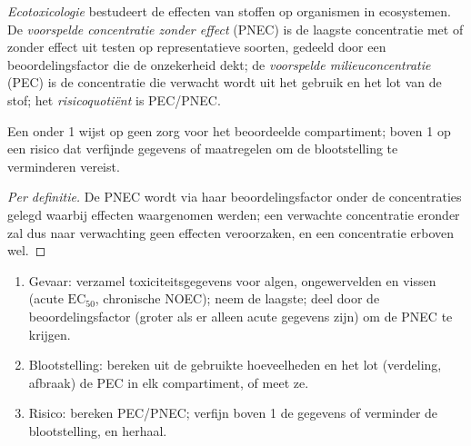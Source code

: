\begin{definition}[Ecotoxicologie]\label{def:b3:environmental-toxicology:ecotoxicology}
\emph{Ecotoxicologie} bestudeert de effecten van
stoffen op organismen in ecosystemen. De
\emph{voorspelde concentratie zonder effect}
(PNEC) is de laagste concentratie met of zonder effect uit testen op
representatieve soorten, gedeeld door een beoordelingsfactor die de
onzekerheid dekt; de
\emph{voorspelde milieuconcentratie}
(PEC) is de concentratie die verwacht wordt uit het gebruik en het lot
van de stof; het \emph{risicoquotiënt}
is PEC/PNEC.
\end{definition}

\begin{proposition}[Risicoquotiënt]\label{prop:b3:environmental-toxicology:risk-quotient}
Een  onder 1 wijst op geen zorg voor het beoordeelde
compartiment; boven 1 op een risico dat verfijnde gegevens of maatregelen
om de blootstelling te verminderen vereist.
\end{proposition}

\begin{proof}[Per definitie]
De PNEC wordt via haar beoordelingsfactor onder de concentraties gelegd
waarbij effecten waargenomen werden; een verwachte concentratie eronder
zal dus naar verwachting geen effecten veroorzaken, en een concentratie
erboven wel.
\end{proof}

\begin{method}\label{met:b3:environmental-toxicology:risk}
\begin{enumerate}
  \item Gevaar: verzamel toxiciteitsgegevens voor algen, ongewervelden en
        vissen (acute
        $\mathrm{EC_{50}}$, chronische NOEC); neem de laagste; deel door de beoordelingsfactor (groter als
        er alleen acute gegevens zijn) om de PNEC te krijgen.
  \item Blootstelling: bereken uit de gebruikte hoeveelheden en het lot
        (verdeling, afbraak) de PEC in elk compartiment, of meet ze.
  \item Risico: bereken PEC/PNEC; verfijn boven 1 de gegevens of verminder
        de blootstelling, en herhaal.
\end{enumerate}
\end{method}

